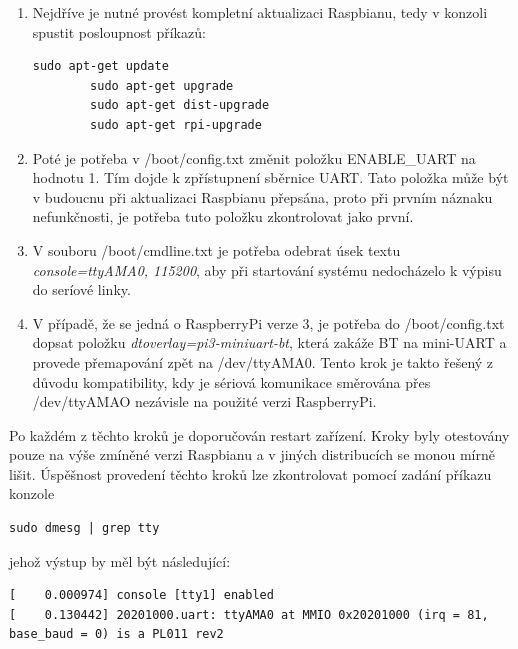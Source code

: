 \begin{enumerate}
	\item Nejdříve je nutné provést kompletní aktualizaci Raspbianu, tedy v konzoli spustit posloupnost příkazů:
	
	\begin{lstlisting}[style=MyCodeBash]
		sudo apt-get update
		sudo apt-get upgrade
		sudo apt-get dist-upgrade
		sudo apt-get rpi-upgrade	
	\end{lstlisting}
					
	\item Poté je potřeba v /boot/config.txt změnit položku ENABLE\_UART na hodnotu 1. Tím dojde k zpřístupnení sběrnice UART. Tato položka může být v budoucnu při aktualizaci Raspbianu přepsána, proto při prvním náznaku nefunkčnosti, je potřeba tuto položku zkontrolovat jako první.
	\item V souboru /boot/cmdline.txt je potřeba odebrat úsek textu \textit{console=ttyAMA0, 115200}, aby při startování systému nedocházelo k výpisu do seríové linky. 
	\item V případě, že se jedná o RaspberryPi verze 3, je potřeba do /boot/config.txt dopsat položku \textit{dtoverlay=pi3-miniuart-bt}, která zakáže BT na mini-UART a provede přemapování zpět na /dev/ttyAMA0. Tento krok je takto řešený z důvodu kompatibility, kdy je sériová komunikace směrována přes /dev/ttyAMAO nezávisle na použité verzi RaspberryPi.
\end{enumerate}

Po každém z těchto kroků je doporučován restart zařízení. Kroky byly otestovány pouze na výše zmíněné verzi Raspbianu a v jiných distribucích se monou mírně lišit. Úspěšnost provedení těchto kroků lze zkontrolovat pomocí zadání příkazu konzole 
	\begin{lstlisting}[style=MyCodeBash]
			sudo dmesg | grep tty
	\end{lstlisting}

jehož výstup by měl být následující:
					
	\begin{lstlisting}[style=MyCodeBash]
[    0.000974] console [tty1] enabled
[    0.130442] 20201000.uart: ttyAMA0 at MMIO 0x20201000 (irq = 81, base_baud = 0) is a PL011 rev2
	\end{lstlisting}



